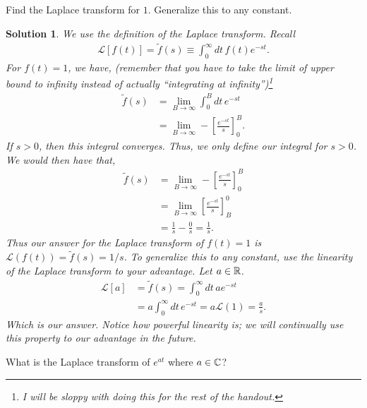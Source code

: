 \documentclass[11pt]{article}
\newtheorem*{solution}{Solution}
\theoremstyle{mystyle}
\begin{document}
\begin{psexample}{}{}
    \begin{hwproblem}
        Find the Laplace transform for $1$. Generalize this
        to any constant.
    \end{hwproblem}
    \begin{solution}
        We use the definition of the Laplace transform.
        Recall
        \begin{align*}
            \mathcal{L}[f(t)] = \tilde{f}(s) \equiv \int_0^\infty dt \, f(t) e^{-st}.
        \end{align*}
        For $f(t) = 1$, we have, (remember that you have to take the limit
        of upper bound to infinity instead of actually ``integrating
        at infinity'')\footnote{I will be sloppy with doing this 
        for the rest of the handout.}
        \begin{align*}
            \tilde{f}(s) & = \lim_{B \to \infty} \int_0^B dt \, e^{-st}\\
            & = \lim_{B \to \infty} - \left[ \frac{e^{-st}}{s} \right]_0^B.
        \end{align*}
        If $s > 0$, then this integral converges. Thus,
        we only define our integral for $s > 0$.
        We would then have that,
        \begin{align*}
            \tilde{f}(s) & = \lim_{B \to \infty} - \left[ \frac{e^{-st}}{s}\right]_0^B\\
            & = \lim_{B \to \infty} \left[ \frac{e^{-st}}{s} \right]_B^0\\
            & = \frac{1}{s} - \frac{0}{s} = \frac{1}{s}.
        \end{align*}
        Thus our answer for the Laplace transform of $f(t) = 1$
        is $\mathcal{L}(f(t)) = \tilde{f}(s) = 1/s$.
        To generalize this to any constant, use the
        \emph{linearity} of the Laplace transform to your
        advantage. Let $a \in \mathbb{R}$.
        \begin{align*}
            \mathcal{L}[a] & = \tilde{f}(s) = \int_0^\infty dt \, a e^{-st}\\
            & =  a \int_0^\infty dt \, e^{-st} = a\mathcal{L}(1) = \frac{a}{s}.
        \end{align*}
        Which is our answer. Notice how powerful linearity is; we will continually
        use this property to our advantage in the future.
    \end{solution}
    \begin{hwproblem}
        What is the Laplace transform of $e^{at}$ where $a \in \mathbb{C}$?

\end{hwproblem}
\end{psexample}
\end{document}
